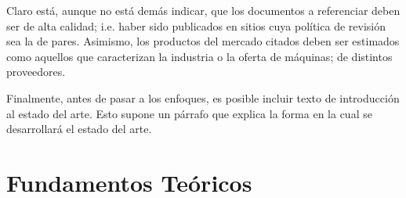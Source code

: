 Claro está, aunque no está demás indicar, que los documentos a referenciar deben ser de alta calidad; i.e. haber sido publicados en sitios cuya política de revisión sea la de pares. Asimismo, los productos del mercado citados deben ser estimados como aquellos que caracterizan la industria o la oferta de máquinas; de distintos proveedores. 
 
Finalmente, antes de pasar a los enfoques, es posible incluir texto de introducción al estado del arte. Esto supone un párrafo que explica la forma en la cual se desarrollará el estado del arte.

\section{Fundamentos Teóricos}

